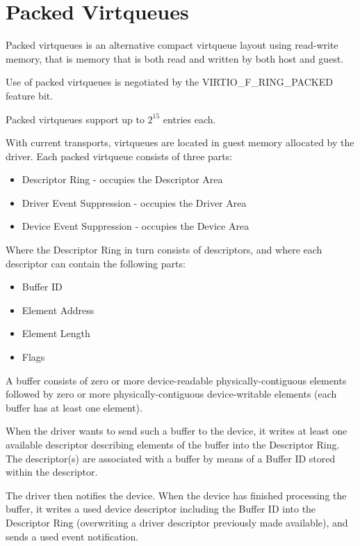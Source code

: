 \section{Packed Virtqueues}\label{sec:Basic Facilities of a Virtio Device / Packed Virtqueues}

Packed virtqueues is an alternative compact virtqueue layout using
read-write memory, that is memory that is both read and written
by both host and guest.

Use of packed virtqueues is negotiated by the VIRTIO_F_RING_PACKED
feature bit.

Packed virtqueues support up to $2^{15}$ entries each.

With current transports, virtqueues are located in guest memory
allocated by the driver.
Each packed virtqueue consists of three parts:

\begin{itemize}
\item Descriptor Ring - occupies the Descriptor Area
\item Driver Event Suppression - occupies the Driver Area
\item Device Event Suppression - occupies the Device Area
\end{itemize}

Where the Descriptor Ring in turn consists of descriptors,
and where each descriptor can contain the following parts:

\begin{itemize}
\item Buffer ID
\item Element Address
\item Element Length
\item Flags
\end{itemize}

A buffer consists of zero or more device-readable physically-contiguous
elements followed by zero or more physically-contiguous
device-writable elements (each buffer has at least one element).

When the driver wants to send such a buffer to the device, it
writes at least one available descriptor describing elements of
the buffer into the Descriptor Ring.  The descriptor(s) are
associated with a buffer by means of a Buffer ID stored within
the descriptor.

The driver then notifies the device. When the device has finished
processing the buffer, it writes a used device descriptor
including the Buffer ID into the Descriptor Ring (overwriting a
driver descriptor previously made available), and sends a
used event notification.

